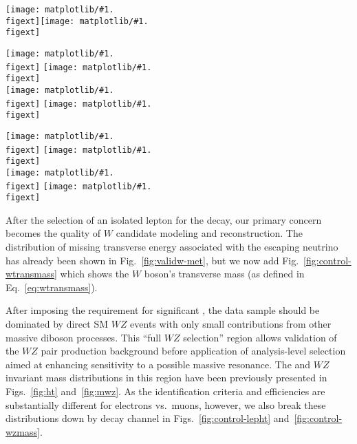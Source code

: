 {\newcommand{\myplot}[1]{\texttt{[image: matplotlib/\#1.\\figext]}}

\begin{figure*}
  \centering
  \myplot{hWTransMass_ValidW}\hfill\myplot{hWTransMass_ValidWZCand}\\
  \caption[$W$ transverse mass distribution for two selections]{Transverse mass of the selected $W$ candidate before the \MET requirement is applied (left) and after (right).}
  \label{fig:control-wtransmass}
\end{figure*}

\begin{figure*}
  \centering
  \myplot{sreckoplots/hHT_3e}\hfill
  \myplot{sreckoplots/hHT_2e}\\
  \myplot{sreckoplots/hHT_2mu}\hfill
  \myplot{sreckoplots/hHT_3mu}\\
  \caption{Distribution of \lepht{} after the \MET requirement is applied, shown separately for each of the four decay channels.}
  \label{fig:control-lepht}
\end{figure*}

\begin{figure*}
  \centering
  \myplot{hWZ3e0muMass_ValidWZCand}\hfill
  \myplot{hWZ2e1muMass_ValidWZCand}\\
  \myplot{hWZ1e2muMass_ValidWZCand}\hfill
  \myplot{hWZ0e3muMass_ValidWZCand}\\
  \caption{Mass of the $WZ$ candidate after the \MET requirement is applied, shown separately for each of the four decay channels.}
  \label{fig:control-wzmass}
\end{figure*}

} %

After the selection of an isolated lepton for the \wtolnu decay, our primary concern becomes the quality of $W$ candidate modeling and reconstruction.  The distribution of missing transverse energy associated with the escaping neutrino has already been shown in Fig.~\ref{fig:validw-met}, but we now add Fig.~\ref{fig:control-wtransmass} which shows the $W$ boson's transverse mass (as defined in Eq.~\ref{eq:wtransmass}).

After imposing the requirement for significant \MET, the data sample should be dominated by direct SM $WZ$ events with only small contributions from other massive diboson processes.  This ``full $WZ$ selection'' region allows validation of the $WZ$ pair production background before application of analysis-level selection aimed at enhancing sensitivity to a possible massive resonance.  The \lepht{} and $WZ$ invariant mass distributions in this region have been previously presented in Figs.~\ref{fig:ht} and~\ref{fig:mwz}.  As the identification criteria and efficiencies are substantially different for electrons vs.\ muons, however, we also break these distributions down by decay channel in Figs.~\ref{fig:control-lepht} and~\ref{fig:control-wzmass}.

